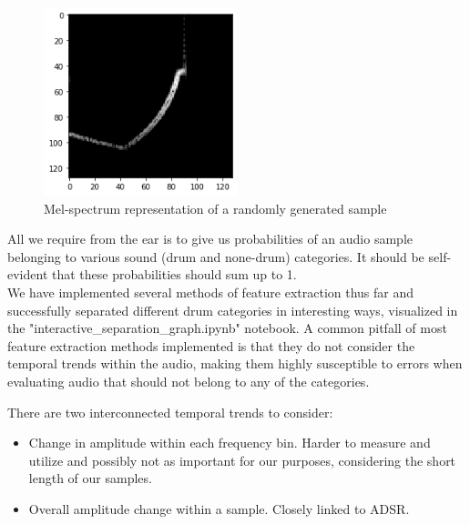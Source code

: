\documentclass{nime-alternate} %
\begin{document}
\begin{figure}[h!]
\centering
\includegraphics[width=0.5\textwidth]{images/specplot.png}
\caption{Mel-spectrum representation of a randomly generated sample}
\label{fig:SSS generator}
\end{figure}
All we require from the ear is to give us probabilities of an audio sample belonging to various sound (drum and none-drum) categories. It should be self-evident that these probabilities should sum up to 1.\\

We have implemented several methods of feature extraction thus far and successfully separated different drum categories in interesting ways, visualized in the "interactive\_separation\_graph.ipynb" notebook. A common pitfall of most feature extraction methods implemented is that they do not consider the temporal trends within the audio, making them highly susceptible to errors when evaluating audio that should not belong to any of the categories.\\

There are two interconnected temporal trends to consider: 
\begin{itemize}
    \item Change in amplitude within each frequency bin. Harder to measure and utilize and possibly not as important for our purposes, considering the short length of our samples.
    \item Overall amplitude change within a sample. Closely linked to ADSR. 
\end{itemize}{}
\end{document}
